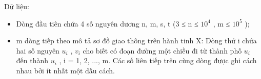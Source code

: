 Dữ liệu:
\begin{itemize}
	\item Dòng đầu tiên chứa 4 số nguyên dương n, m, s, t (3 ≤ n ≤ $10^{4}$ , m ≤ $10^{5}$ );
	\item m dòng tiếp theo mô tả sơ đồ giao thông trên hành tinh X: Dòng thứ i chứa hai số nguyên $u_{i}$ , $v_{i}$ cho biết có đoạn đường một chiều đi từ thành phố $u_{i}$ đến thành $u_{i}$ , i = 1, 2, ..., m. Các số liên tiếp trên cùng dòng được ghi cách nhau bởi ít nhất một dấu cách.
\end{itemize}